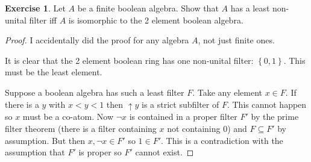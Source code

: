 \documentclass{article}
\newcommand{\set}[1]{\left\{#1\right\}}
\theoremstyle{definition}
\newtheorem{question}{Exercise}
\begin{document}
\begin{question}
    Let \(A\) be a finite boolean algebra. Show that \(A\) has a least
    non-unital filter iff \(A\) is isomorphic to the 2 element boolean algebra.

    \begin{proof}
        I accidentally did the proof for any algebra \(A\), not just finite
        ones.

        It is clear that the 2 element boolean ring has one non-unital filter:
        \(\set{0,1}\). This must be the least element.

        Suppose a boolean algebra has such a least filter \(F\). Take any
        element \(x\in F\). If there is a \(y\) with \(x<y<1\) then \(\uparrow
        y\) is a strict subfilter of \(F\). This cannot happen so \(x\) must be
        a co-atom. Now \(\neg x\) is contained in a proper filter \(F'\) by the
        prime filter theorem (there is a filter containing \(x\) not containing
        \(0\)) and \(F\subseteq F'\) by assumption. But then \(x,\neg x\in F'\)
        so \(1\in F'\). This is a contradiction with the assumption that \(F'\)
        is proper so \(F'\) cannot exist.
    \end{proof}
\end{question}
\end{document}
